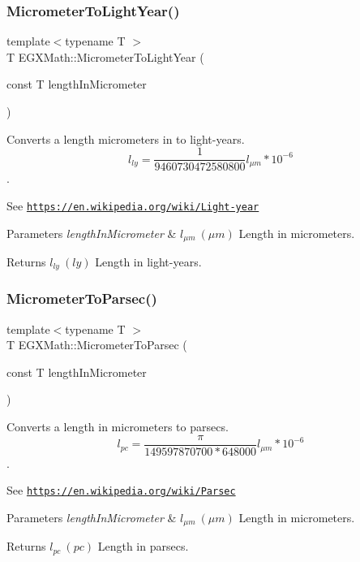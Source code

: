 \subsubsection{\texorpdfstring{Micrometer\+To\+Light\+Year()}{MicrometerToLightYear()}}
{\footnotesize\ttfamily template$<$typename T $>$ \\
T E\+G\+X\+Math\+::\+Micrometer\+To\+Light\+Year (\begin{DoxyParamCaption}\item[{const T}]{length\+In\+Micrometer }\end{DoxyParamCaption})}



Converts a length micrometers in to light-\/years. \[ l_{ly}= \frac{1}{9460730472580800} l_{\mu m} * 10^{-6} \]. 

See \href{https://en.wikipedia.org/wiki/Light-year}{\tt https\+://en.\+wikipedia.\+org/wiki/\+Light-\/year} 
\begin{DoxyParams}{Parameters}
{\em length\+In\+Micrometer} & $ l_{\mu m}\ (\mu m)$ Length in micrometers. \\
\hline
\end{DoxyParams}
\begin{DoxyReturn}{Returns}
$ l_{ly}\ (ly)$ Length in light-\/years. 
\end{DoxyReturn}
\mbox{\label{group___e_g_x_math-_conversions-_length_conversions-_micrometer-_astronomical_gab7d1e9a1568a8691855121c9cf2b38f5}} 
\subsubsection{\texorpdfstring{Micrometer\+To\+Parsec()}{MicrometerToParsec()}}
{\footnotesize\ttfamily template$<$typename T $>$ \\
T E\+G\+X\+Math\+::\+Micrometer\+To\+Parsec (\begin{DoxyParamCaption}\item[{const T}]{length\+In\+Micrometer }\end{DoxyParamCaption})}



Converts a length in micrometers to parsecs. \[ l_{pc}=\frac{\pi}{149597870700 * 648000} l_{\mu m} * 10^{-6} \]. 

See \href{https://en.wikipedia.org/wiki/Parsec}{\tt https\+://en.\+wikipedia.\+org/wiki/\+Parsec} 
\begin{DoxyParams}{Parameters}
{\em length\+In\+Micrometer} & $ l_{\mu m}\ (\mu m)$ Length in micrometers. \\
\hline
\end{DoxyParams}
\begin{DoxyReturn}{Returns}
$ l_{pc}\ (pc)$ Length in parsecs. 
\end{DoxyReturn}
